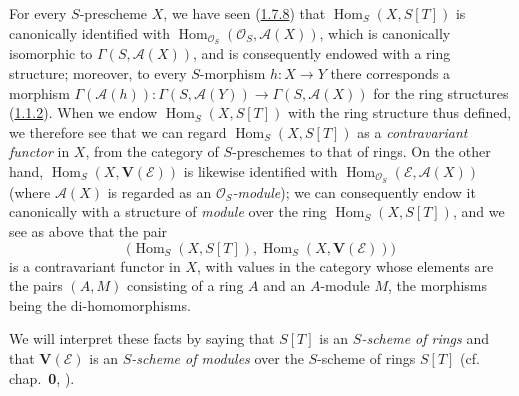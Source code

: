\begin{env}[1.7.13]
\label{II.1.7.13}
For every $S$-prescheme $X$, we have seen
(\hyperref[II.1.7.8]{1.7.8}) that
$\operatorname{Hom}_S(X,S[T])$ is canonically identified with
$\operatorname{Hom}_{\mathcal{O}_S}(\mathcal{O}_S,\mathcal{A}(X))$, which
is canonically isomorphic to $\Gamma(S,\mathcal{A}(X))$, and is
consequently endowed with a ring structure; moreover, to every
$S$-morphism $h:X\to Y$ there corresponds a morphism
$\Gamma(\mathcal{A}(h)):\Gamma(S,\mathcal{A}(Y))
\to\Gamma(S,\mathcal{A}(X))$ for the ring structures
(\hyperref[II.1.1.2]{1.1.2}). When we endow
$\operatorname{Hom}_S(X,S[T])$ with the ring structure thus defined, we
therefore see that we can regard $\operatorname{Hom}_S(X,S[T])$ as a
\emph{contravariant functor} in $X$, from the category of $S$-preschemes
to that of rings. On the other hand,
$\operatorname{Hom}_S(X,\mathbf{V}(\mathcal{E}))$ is likewise identified
with $\operatorname{Hom}_{\mathcal{O}_S}(\mathcal{E},\mathcal{A}(X))$
(where $\mathcal{A}(X)$ is regarded as an
\emph{$\mathcal{O}_S$-module}); we can consequently endow it canonically
with a structure of \emph{module} over the ring
$\operatorname{Hom}_S(X,S[T])$, and we see as above that the pair
\[
  \bigl(\operatorname{Hom}_S(X,S[T]),
  \operatorname{Hom}_S(X,\mathbf{V}(\mathcal{E}))\bigr)
\]
is a contravariant functor in $X$, with values in the category whose
elements are the pairs $(A,M)$ consisting of a ring $A$ and an $A$-module
$M$, the morphisms being the di-homomorphisms.

We will interpret these facts by saying that $S[T]$ is an
\emph{$S$-scheme of rings} and that $\mathbf{V}(\mathcal{E})$ is an
\emph{$S$-scheme of modules} over the $S$-scheme of rings $S[T]$
(cf. chap.~\textbf{0}, ).
\end{env}

